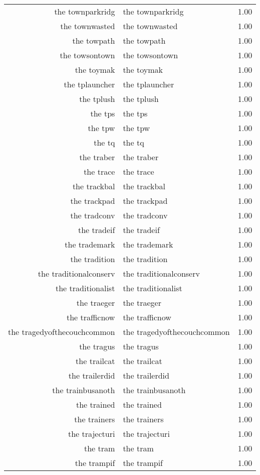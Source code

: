 \begin{table}[ht]
\begin{tabular}{rlr}
  the townparkridg & the townparkridg & 1.00 \\ 
  the townwasted & the townwasted & 1.00 \\ 
  the towpath & the towpath & 1.00 \\ 
  the towsontown & the towsontown & 1.00 \\ 
  the toymak & the toymak & 1.00 \\ 
  the tplauncher & the tplauncher & 1.00 \\ 
  the tplush & the tplush & 1.00 \\ 
  the tps & the tps & 1.00 \\ 
  the tpw & the tpw & 1.00 \\ 
  the tq & the tq & 1.00 \\ 
  the traber & the traber & 1.00 \\ 
  the trace & the trace & 1.00 \\ 
  the trackbal & the trackbal & 1.00 \\ 
  the trackpad & the trackpad & 1.00 \\ 
  the tradconv & the tradconv & 1.00 \\ 
  the tradeif & the tradeif & 1.00 \\ 
  the trademark & the trademark & 1.00 \\ 
  the tradition & the tradition & 1.00 \\ 
  the traditionalconserv & the traditionalconserv & 1.00 \\ 
  the traditionalist & the traditionalist & 1.00 \\ 
  the traeger & the traeger & 1.00 \\ 
  the trafficnow & the trafficnow & 1.00 \\ 
  the tragedyofthecouchcommon & the tragedyofthecouchcommon & 1.00 \\ 
  the tragus & the tragus & 1.00 \\ 
  the trailcat & the trailcat & 1.00 \\ 
  the trailerdid & the trailerdid & 1.00 \\ 
  the trainbusanoth & the trainbusanoth & 1.00 \\ 
  the trained & the trained & 1.00 \\ 
  the trainers & the trainers & 1.00 \\ 
  the trajecturi & the trajecturi & 1.00 \\ 
  the tram & the tram & 1.00 \\ 
  the trampif & the trampif & 1.00 \\ 

\end{tabular}
\end{table}
